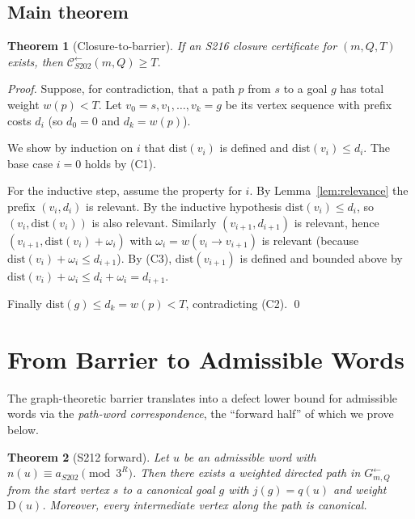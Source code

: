 \documentclass[11pt,a4paper]{article}
\theoremstyle{plain}
\newtheorem{theorem}{Theorem}[section]
\theoremstyle{definition}
\theoremstyle{plain}
\newcommand{\InvG}{G^{\leftarrow}}
\newcommand{\Calphax}{\mathcal{C}^{\leftarrow}_{S202}}
\newcommand{\aS}{a_{S202}}
\newcommand{\defect}{\mathrm{D}}
\begin{document}
\subsection{Main theorem}
\begin{theorem}[Closure-to-barrier]\label{thm:closure-to-barrier}
If an S216 closure certificate for $(m, Q, T)$ exists, then
$\Calphax(m, Q) \ge T$.
\end{theorem}

\begin{proof}
Suppose, for contradiction, that a path $p$ from $s$ to a goal $g$
has total weight $w(p) < T$. Let $v_0 = s, v_1, \dots, v_k = g$ be its
vertex sequence with prefix costs $d_i$ (so $d_0 = 0$ and $d_k = w(p)$).

We show by induction on $i$ that
$\mathrm{dist}(v_i)$ is defined and $\mathrm{dist}(v_i) \le d_i$.
The base case $i = 0$ holds by (C1).

For the inductive step, assume the property for $i$. By
Lemma~\ref{lem:relevance} the prefix $(v_i, d_i)$ is relevant. By
the inductive hypothesis $\mathrm{dist}(v_i) \le d_i$, so
$(v_i, \mathrm{dist}(v_i))$ is also relevant. Similarly
$(v_{i+1}, d_{i+1})$ is relevant, hence
$(v_{i+1}, \mathrm{dist}(v_i) + \omega_i)$ with
$\omega_i = w(v_i \to v_{i+1})$ is relevant (because
$\mathrm{dist}(v_i) + \omega_i \le d_{i+1}$).
By (C3), $\mathrm{dist}(v_{i+1})$ is defined and bounded above by
$\mathrm{dist}(v_i) + \omega_i \le d_i + \omega_i = d_{i+1}$.

Finally $\mathrm{dist}(g) \le d_k = w(p) < T$, contradicting (C2). \qed
\end{proof}

\section{From Barrier to Admissible Words}\label{sec:s212-forward}

The graph-theoretic barrier translates into a defect lower bound for
admissible words via the \emph{path-word correspondence}, the
``forward half'' of which we prove below.

\begin{theorem}[S212 forward]\label{thm:s212-forward}
Let $u$ be an admissible word with
$n(u) \equiv \aS \pmod{3^R}$.
Then there exists a weighted directed path in
$\InvG_{m,Q}$ from the start vertex $s$ to a canonical goal $g$ with
$j(g) = q(u)$ and weight $\defect(u)$.
Moreover, every intermediate vertex along the path is canonical.
\end{theorem}
\end{document}
